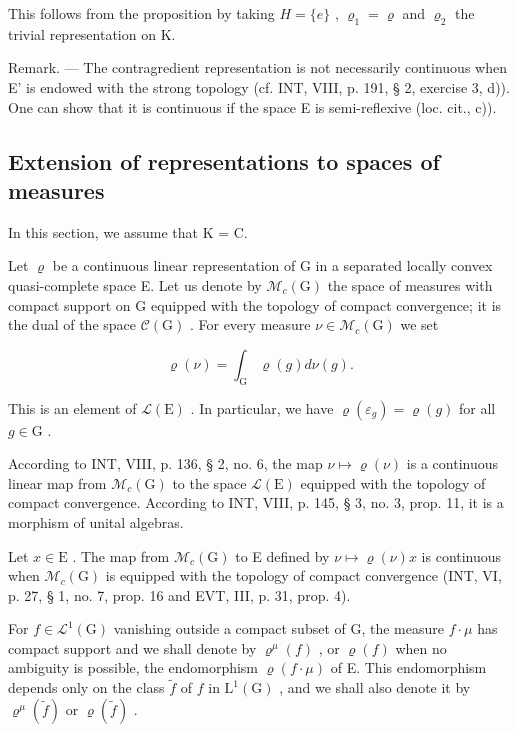 This follows from the proposition by taking \(H = \{e\}\) , \(\varrho_{1} = \varrho\) and \(\varrho_{2}\) the trivial representation on K.

Remark. --- The contragredient representation is not necessarily continuous when E' is endowed with the strong topology (cf. INT, VIII, p. 191, § 2, exercise 3, d)). One can show that it is continuous if the space E is semi-reflexive (loc. cit., c)).

\subsection{Extension of representations to spaces of measures}

In this section, we assume that K = C.

Let \(\varrho\) be a continuous linear representation of G in a separated locally convex quasi-complete space E. Let us denote by \(\mathcal{M}_{c}(\mathrm{G})\) the space of measures with compact support on G equipped with the topology of compact convergence; it is the dual of the space \(\mathcal{C}(\mathrm{G})\) . For every measure \(\nu \in \mathcal{M}_{c}(\mathrm{G})\) we set

\[
\varrho (\nu) = \int_ {\mathrm{G}} \varrho (g) d \nu (g).
\]

This is an element of \(\mathcal{L}(\mathrm{E})\) . In particular, we have \(\varrho(\varepsilon_g) = \varrho(g)\) for all \(g \in \mathrm{G}\) .

According to INT, VIII, p. 136, § 2, no. 6, the map \(\nu \mapsto \varrho(\nu)\) is a continuous linear map from \(\mathcal{M}_c(\mathrm{G})\) to the space \(\mathcal{L}(\mathrm{E})\) equipped with the topology of compact convergence. According to INT, VIII, p. 145, § 3, no. 3, prop. 11, it is a morphism of unital algebras.

Let \(x \in \mathrm{E}\) . The map from \(\mathcal{M}_c(\mathrm{G})\) to E defined by \(\nu \mapsto \varrho(\nu)x\) is continuous when \(\mathcal{M}_c(\mathrm{G})\) is equipped with the topology of compact convergence (INT, VI, p. 27, § 1, no. 7, prop. 16 and EVT, III, p. 31, prop. 4).

For \(f \in \mathcal{L}^{1}(\mathrm{G})\) vanishing outside a compact subset of G, the measure \(f \cdot \mu\) has compact support and we shall denote by \(\varrho^{\mu}(f)\) , or \(\varrho(f)\) when no ambiguity is possible, the endomorphism \(\varrho(f \cdot \mu)\) of E. This endomorphism depends only on the class \(\widetilde{f}\) of \(f\) in \(\mathrm{L}^{1}(\mathrm{G})\) , and we shall also denote it by \(\varrho^{\mu}(\widetilde{f})\) or \(\varrho(\widetilde{f})\) .

